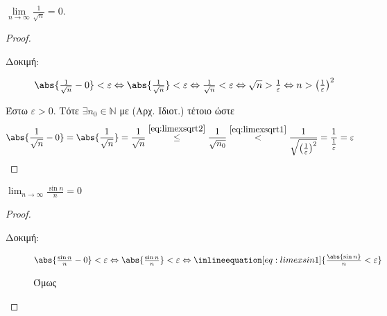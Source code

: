 \documentclass[main.tex]{subfiles}
\begin{document}
\begin{examples}
\begin{enumerate}[i)]
        \item $ \lim\limits_{n \to \infty} \frac{1}{\sqrt{n}} = 0$.
            \begin{proof}
            \item {}
                \begin{description}
                    \item[Δοκιμή:] $ \abs{\frac{1}{\sqrt{n}}-0 } 
                        < \varepsilon 
                        \Leftrightarrow \abs{\frac{1}{\sqrt{n}} } < 
                        \varepsilon 
                        \Leftrightarrow \frac{1}{\sqrt{n}} < 
                        \varepsilon \Leftrightarrow \sqrt{n} >
                        \frac{1}{\varepsilon} \Leftrightarrow n >
                        \left(\frac{1}{\varepsilon}\right)^{2}
                        $
                \end{description}
                Έστω $ \varepsilon > 0 $. Τότε $ \exists n_{0} \in 
                \mathbb{N} $
                με  (Αρχ. Ιδιοτ.) τέτοιο ώστε 
                \[
                    \abs{\frac{1}{\sqrt{n}} -0} = \abs{\frac{1}{\sqrt{n}}} =
                    \frac{1}{\sqrt{n}} \overset{\eqref{eq:limexsqrt2}}{\leq}
                    \frac{1}{\sqrt{n_{0}}} \overset{\eqref{eq:limexsqrt1}}
                    {<} \frac{1}{\sqrt{\left(\frac{1}{\varepsilon}\right)
                    ^{2}}} = \frac{1}{\frac{1}{\varepsilon}} = \varepsilon
                \] 
            \end{proof}

        \item $ \lim_{n \to \infty} \frac{\sin{n}}{n} = 0 $

            \begin{proof}
            \item {}
                \begin{description}
                    \item[Δοκιμή:] $ \abs{\frac{\sin{n}}{n} - 0} < 
                        \varepsilon \Leftrightarrow \abs{\frac{\sin{n}}{n}}
                        < \varepsilon \Leftrightarrow 
                        \inlineequation[eq:limexsin1]{\frac{\abs{\sin{n}}}
                        {n} < \varepsilon} $

                        Όμως


\end{description}
\end{proof}
\end{enumerate}
\end{examples}
\end{document}
